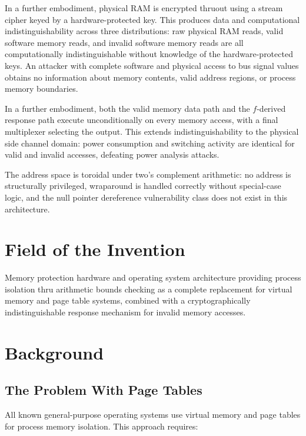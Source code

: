 \documentclass[12pt,letterpaper]{article}
\begin{document}
In a further embodiment, physical RAM is encrypted thruout using a
stream cipher keyed by a hardware-protected key.
This produces data and computational indistinguishability across three
distributions: raw physical RAM reads, valid software memory reads,
and invalid software memory reads are all computationally
indistinguishable without knowledge of the hardware-protected keys.
An attacker with complete software and physical access to bus signal
values obtains no information about memory contents, valid address
regions, or process memory boundaries.

In a further embodiment, both the valid memory data path and the
$f$-derived response path execute unconditionally on every memory
access, with a final multiplexer selecting the output. This extends
indistinguishability to the physical side channel domain: power
consumption and switching activity are identical for valid and invalid
accesses, defeating power analysis attacks.

The address space is toroidal under two's complement arithmetic: no
address is structurally privileged, wraparound is handled correctly
without special-case logic, and the null pointer dereference
vulnerability class does not exist in this architecture.

\section{Field of the Invention}

Memory protection hardware and operating system architecture providing
process isolation thru arithmetic bounds checking as a complete
replacement for virtual memory and page table systems, combined with
a cryptographically indistinguishable response mechanism for invalid
memory accesses.

\section{Background}

\subsection{The Problem With Page Tables}

All known general-purpose operating systems use virtual memory and
page tables for process memory isolation. This approach requires:
\end{document}

